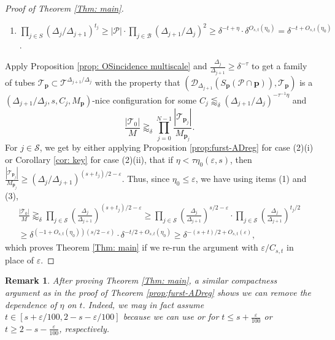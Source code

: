 \documentclass{amsart}
\newtheorem{remark}[prop]{Remark}
\newcommand{\T}{\mathcal{T}}
\newcommand{\eps}{\varepsilon}
\newcommand{\geapp}{\gtrapprox}
\newcommand{\cD}{\mathcal{D}}
\newcommand{\cB}{\mathcal{B}}
\newcommand{\cS}{\mathcal{S}}
\newcommand{\cT}{\mathcal{T}}
\newcommand{\cP}{\mathcal{P}}
\begin{document}
\begin{proof}[Proof of Theorem \ref{Thm: main}]
\begin{enumerate}
        \item $\prod_{j \in S} (\Delta_j/\Delta_{j+1})^{t_j} \ge  |\cP|  \cdot \prod_{j \in \cB} (\Delta_{j+1}/\Delta_{j})^2 \ge \delta^{-t+\eta} \cdot \delta^{O_{s,t} (\eta_0)} = \delta^{-t + O_{s,t} (\eta_0)}$.
    \end{enumerate}
    Apply Proposition \ref{prop: OSincidence multiscale} and $\frac{\Delta_{j}}{\Delta_{j+1}} \ge \delta^{-\tau}$ to get a family of tubes $\cT_{\textbf{p}} \subset \T^{\Delta_{j+1}/\Delta_j}$ with the property that $(\cD_{\Delta_{j+1}} (S_{\textbf{p}} (\cP \cap \textbf{p})), \cT_{\textbf{p}})$ is a $(\Delta_{j+1}/\Delta_j, s, C_j, M_{\textbf{p}})$-nice configuration for some $C_j \lessapprox_\delta (\Delta_{j+1}/\Delta_j)^{-\tau^{-1} \eta}$ and
    \begin{equation*}
        \frac{|\cT_0|}{M} \geapp_\delta \prod_{j=0}^{N-1} \frac{|\cT_{\textbf{p}_j}|}{M_{\textbf{p}_j}}.
    \end{equation*}
    For $j \in \cS$, we get by either applying Proposition \ref{prop:furst-ADreg} for case (2)(i) or Corollary \ref{cor: key} for case (2)(ii), that if $\eta < \tau \eta_0 (\eps, s)$, then $\frac{|\cT_{\textbf{p}_j}|}{M_{\textbf{p}_j}} \ge (\Delta_j/\Delta_{j+1})^{(s+t_j)/2-\eps}$. Thus, since $\eta_0 \le \eps$, we have using items (1) and (3),
    \begin{multline*}
        \frac{|\cT_0|}{M} \geapp_\delta \prod_{j \in \cS} \left( \frac{\Delta_j}{\Delta_{j+1}} \right)^{(s+t_j)/2-\eps} \ge \prod_{j \in \cS} \left( \frac{\Delta_j}{\Delta_{j+1}} \right)^{s/2-\eps} \cdot \prod_{j \in \cS} \left( \frac{\Delta_j}{\Delta_{j+1}} \right)^{t_j/2} \\
        \ge \delta^{(-1+O_{s,t} (\eta_0))(s/2 - \eps)} \cdot \delta^{-t/2 + O_{s,t} (\eta_0)} \ge \delta^{-(s+t)/2 + O_{s,t}(\eps)},
    \end{multline*}
    which proves Theorem \ref{Thm: main} if we re-run the argument with $\eps/C_{s,t}$ in place of $\eps$.
\end{proof}

\begin{remark}
    After proving Theorem \ref{Thm: main}, a similar compactness argument as in the proof of Theorem \ref{prop:furst-ADreg} shows we can remove the dependence of $\eta$ on $t$. Indeed, we may in fact assume $t \in [s + \eps/100, 2 - s - \eps/100]$ because we can use \cite[Corollary 2.14]{orponen2021hausdorff} or \cite[Corollary 5.28]{orponen2023projections} for $t \le s + \frac{\eps}{100}$ or $t \ge 2 - s - \frac{\eps}{100}$, respectively.
\end{remark}



\end{document}
